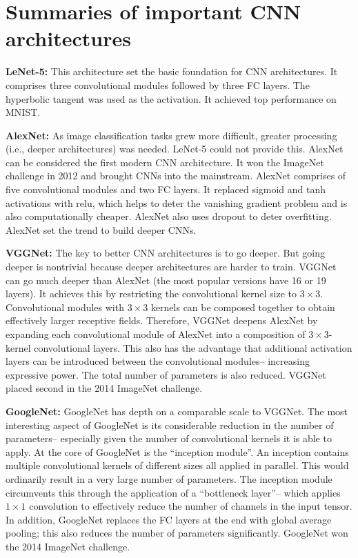 \documentclass[11pt]{article}
\begin{document}
\section{Summaries of important CNN architectures}

\textbf{LeNet-5:} This architecture set the basic foundation for CNN architectures. It comprises three convolutional modules followed by three FC layers. The hyperbolic tangent was used as the activation. It achieved top performance on MNIST.

\textbf{AlexNet:} As image classification tasks grew more difficult, greater processing (i.e., deeper architectures) was needed. LeNet-5 could not provide this. AlexNet can be considered the first modern CNN architecture. It won the ImageNet challenge in 2012 and brought CNNs into the mainstream. AlexNet comprises of five convolutional modules and two FC layers. It replaced sigmoid and tanh activations with relu, which helps to deter the vanishing gradient problem and is also computationally cheaper. AlexNet also uses dropout to deter overfitting. AlexNet set the trend to build deeper CNNs.

\textbf{VGGNet:} The key to better CNN architectures is to go deeper. But going deeper is nontrivial because deeper architectures are harder to train. VGGNet can go much deeper than AlexNet (the most popular versions have 16 or 19 layers). It achieves this by restricting the convolutional kernel size to $3\times 3$. Convolutional modules with $3\times 3$ kernels can be composed together to obtain effectively larger receptive fields. Therefore, VGGNet deepens AlexNet by expanding each convolutional module of AlexNet into a composition of $3\times 3$-kernel convolutional layers. This also has the advantage that additional activation layers can be introduced between the convolutional modules-- increasing expressive power. The total number of parameters is also reduced. VGGNet placed second in the 2014 ImageNet challenge.

\textbf{GoogleNet:} GoogleNet has depth on a comparable scale to VGGNet. The most interesting aspect of GoogleNet is its considerable reduction in the number of parameters-- especially given the number of convolutional kernels it is able to apply. At the core of GoogleNet is the ``inception module''. An inception contains multiple convolutional kernels of different sizes all applied in parallel. This would ordinarily result in a very large number of parameters. The inception module circumvents this through the application of a ``bottleneck layer''-- which applies $1\times 1$ convolution to effectively reduce the number of channels in the input tensor. In addition, GoogleNet replaces the FC layers at the end with global average pooling; this also reduces the number of parameters significantly. GoogleNet won the 2014 ImageNet challenge.
\end{document}

